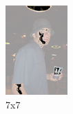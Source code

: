 \documentclass[12pt]{report}
\begin{document}
\begin{figure}[h!]
\begin{subfigure}[b]{0.3\linewidth}
			\includegraphics[width=\linewidth]{resources/texture_7_7.png}
			\caption{7x7}
		\end{subfigure}
		\begin{subfigure}[b]{0.3\linewidth}

\end{subfigure}
\end{figure}
\end{document}
